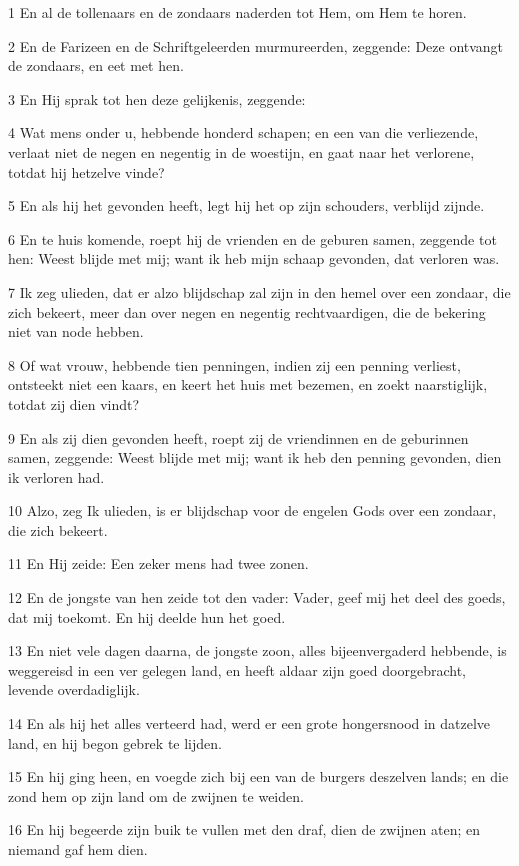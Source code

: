 \par 1 En al de tollenaars en de zondaars naderden tot Hem, om Hem te horen.
\par 2 En de Farizeen en de Schriftgeleerden murmureerden, zeggende: Deze ontvangt de zondaars, en eet met hen.
\par 3 En Hij sprak tot hen deze gelijkenis, zeggende:
\par 4 Wat mens onder u, hebbende honderd schapen; en een van die verliezende, verlaat niet de negen en negentig in de woestijn, en gaat naar het verlorene, totdat hij hetzelve vinde?
\par 5 En als hij het gevonden heeft, legt hij het op zijn schouders, verblijd zijnde.
\par 6 En te huis komende, roept hij de vrienden en de geburen samen, zeggende tot hen: Weest blijde met mij; want ik heb mijn schaap gevonden, dat verloren was.
\par 7 Ik zeg ulieden, dat er alzo blijdschap zal zijn in den hemel over een zondaar, die zich bekeert, meer dan over negen en negentig rechtvaardigen, die de bekering niet van node hebben.
\par 8 Of wat vrouw, hebbende tien penningen, indien zij een penning verliest, ontsteekt niet een kaars, en keert het huis met bezemen, en zoekt naarstiglijk, totdat zij dien vindt?
\par 9 En als zij dien gevonden heeft, roept zij de vriendinnen en de geburinnen samen, zeggende: Weest blijde met mij; want ik heb den penning gevonden, dien ik verloren had.
\par 10 Alzo, zeg Ik ulieden, is er blijdschap voor de engelen Gods over een zondaar, die zich bekeert.
\par 11 En Hij zeide: Een zeker mens had twee zonen.
\par 12 En de jongste van hen zeide tot den vader: Vader, geef mij het deel des goeds, dat mij toekomt. En hij deelde hun het goed.
\par 13 En niet vele dagen daarna, de jongste zoon, alles bijeenvergaderd hebbende, is weggereisd in een ver gelegen land, en heeft aldaar zijn goed doorgebracht, levende overdadiglijk.
\par 14 En als hij het alles verteerd had, werd er een grote hongersnood in datzelve land, en hij begon gebrek te lijden.
\par 15 En hij ging heen, en voegde zich bij een van de burgers deszelven lands; en die zond hem op zijn land om de zwijnen te weiden.
\par 16 En hij begeerde zijn buik te vullen met den draf, dien de zwijnen aten; en niemand gaf hem dien.
